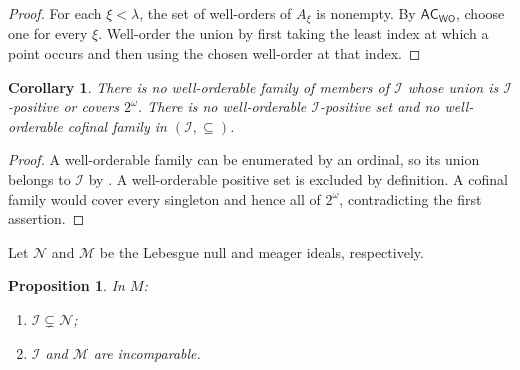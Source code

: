 \documentclass[11pt,reqno]{amsart}
\newcommand{\WO}{\mathsf{WO}}
\newcommand{\cM}{\mathcal M}
\newcommand{\cN}{\mathcal N}
\theoremstyle{plain}
\newtheorem{proposition}[proposition]{Proposition}
\newtheorem{corollary}[corollary]{Corollary}
\theoremstyle{definition}
\theoremstyle{remark}
\begin{document}
\begin{proof}
For each $\xi<\lambda$, the set of well-orders of $A_\xi$ is nonempty.  By
$\mathsf{AC}_{\WO}$, choose one for every $\xi$.  Well-order the union by
first taking the least index at which a point occurs and then using the
chosen well-order at that index.
\end{proof}

\begin{corollary}\label{cor:ideal-invariants}
There is no well-orderable family of members of $\mathcal I$ whose union is
$\mathcal I$-positive or covers $2^\omega$.  There is no well-orderable
$\mathcal I$-positive set and no well-orderable cofinal family in
$(\mathcal I,\subseteq)$.
\end{corollary}

\begin{proof}
A well-orderable family can be enumerated by an ordinal, so its union belongs
to $\mathcal I$ by .  A well-orderable positive
set is excluded by definition.  A cofinal family would cover every singleton
and hence all of $2^\omega$, contradicting the first assertion.
\end{proof}

Let $\cN$ and $\cM$ be the Lebesgue null and meager ideals, respectively.

\begin{proposition}\label{prop:ideal-comparisons}
In $M$:
\begin{enumerate}
\item $\mathcal I\subsetneq\cN$;
\item $\mathcal I$ and $\cM$ are incomparable.
\end{enumerate}
\end{proposition}
\end{document}
